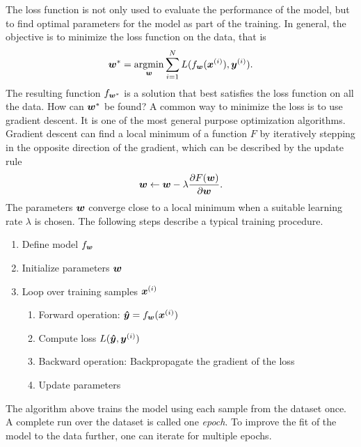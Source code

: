 		The loss function is not only used to evaluate the performance of the model, but to find optimal parameters for the model as part of the training.
		In general, the objective is to minimize the loss function on the data, that is
		\begin{equation}\label{eq:optimal_parameter_neural_network}
			\bm{w}^\ast = \operatorname*{argmin}_{\bm{w}} 
			\sum_{i = 1}^{N} 
				L(f_{\bm{w}}(\bm{x}^{(i)}), \bm{y}^{(i)}).
		\end{equation}
		The resulting function $f_{\bm{w}^\ast}$ is a solution that best satisfies the loss function on all the data.
		How can $\bm{w}^\ast$ be found?
		A common way to minimize the loss is to use gradient descent.
		It is one of the most general purpose optimization algorithms.
		Gradient descent can find a local minimum of a function $F$ by iteratively stepping in the opposite direction of the gradient, which can be described by the update rule
		\begin{equation}
			\bm{w} \leftarrow 
			\bm{w} - \lambda \frac{\partial F(\bm{w})}{\partial \bm{w}}.
		\end{equation}
		The parameters $\bm{w}$ converge close to a local minimum when a suitable learning rate $\lambda$ is chosen. 
		The following steps describe a typical training procedure.
		\begin{enumerate}
			\item Define model $f_{\bm{w}}$
			\item Initialize parameters $\bm{w}$
			\item Loop over training samples $\bm{x}^{(i)}$ %
			\begin{enumerate}
				\item Forward operation: $\bm{\hat{y}} = f_{\bm{w}}(\bm{x}^{(i)})$
				\item Compute loss $L(\bm{\hat{y}}, \bm{y}^{(i)})$
				\item Backward operation: Backpropagate the gradient of the loss 
				\item Update parameters
			\end{enumerate}
		\end{enumerate}
		The algorithm above trains the model using each sample from the dataset once.
		A complete run over the dataset is called one \emph{epoch}.
		To improve the fit of the model to the data further, one can iterate for multiple epochs.
		
